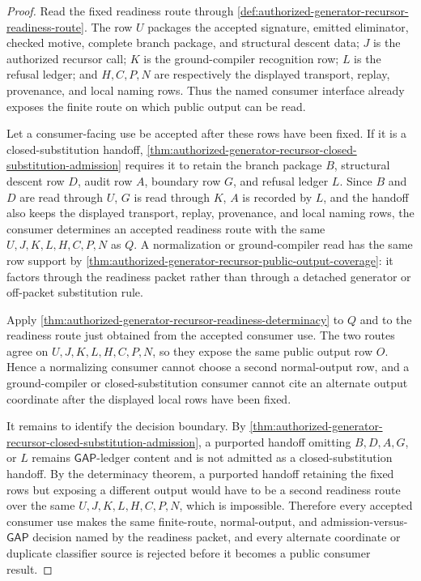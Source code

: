 \begin{proof}
Read the fixed readiness route through \autoref{def:authorized-generator-recursor-readiness-route}. The row $U$ packages the accepted signature, emitted eliminator, checked motive, complete branch package, and structural descent data; $J$ is the authorized recursor call; $K$ is the ground-compiler recognition row; $L$ is the refusal ledger; and $H,C,P,N$ are respectively the displayed transport, replay, provenance, and local naming rows. Thus the named consumer interface already exposes the finite route on which public output can be read.

Let a consumer-facing use be accepted after these rows have been fixed. If it is a closed-substitution handoff, \autoref{thm:authorized-generator-recursor-closed-substitution-admission} requires it to retain the branch package $B$, structural descent row $D$, audit row $A$, boundary row $G$, and refusal ledger $L$. Since $B$ and $D$ are read through $U$, $G$ is read through $K$, $A$ is recorded by $L$, and the handoff also keeps the displayed transport, replay, provenance, and local naming rows, the consumer determines an accepted readiness route with the same $U,J,K,L,H,C,P,N$ as $Q$. A normalization or ground-compiler read has the same row support by \autoref{thm:authorized-generator-recursor-public-output-coverage}: it factors through the readiness packet rather than through a detached generator or off-packet substitution rule.

Apply \autoref{thm:authorized-generator-recursor-readiness-determinacy} to $Q$ and to the readiness route just obtained from the accepted consumer use. The two routes agree on $U,J,K,L,H,C,P,N$, so they expose the same public output row $O$. Hence a normalizing consumer cannot choose a second normal-output row, and a ground-compiler or closed-substitution consumer cannot cite an alternate output coordinate after the displayed local rows have been fixed.

It remains to identify the decision boundary. By \autoref{thm:authorized-generator-recursor-closed-substitution-admission}, a purported handoff omitting $B,D,A,G$, or $L$ remains $\mathsf{GAP}$-ledger content and is not admitted as a closed-substitution handoff. By the determinacy theorem, a purported handoff retaining the fixed rows but exposing a different output would have to be a second readiness route over the same $U,J,K,L,H,C,P,N$, which is impossible. Therefore every accepted consumer use makes the same finite-route, normal-output, and admission-versus-$\mathsf{GAP}$ decision named by the readiness packet, and every alternate coordinate or duplicate classifier source is rejected before it becomes a public consumer result.
\end{proof}
